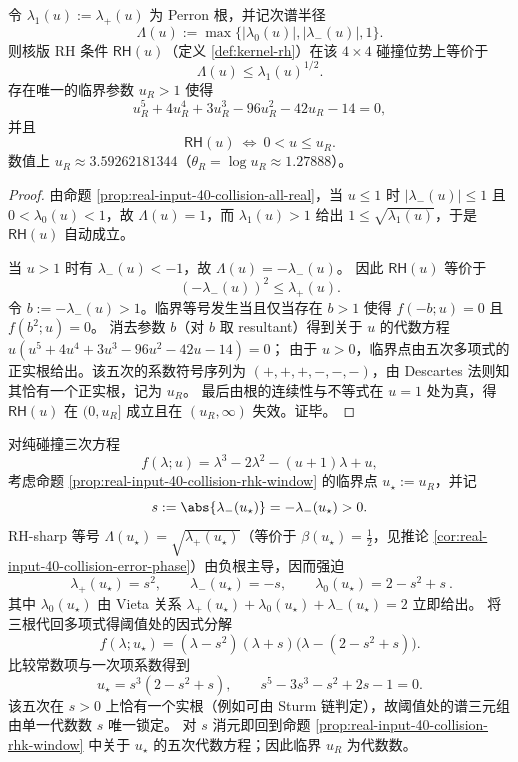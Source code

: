 \begin{proposition}\label{prop:real-input-40-collision-rhk-window}
令 \(\lambda_1(u):=\lambda_+(u)\) 为 Perron 根，并记次谱半径
\[
\Lambda(u):=\max\{|\lambda_0(u)|,|\lambda_-(u)|,1\}.
\]
则核版 RH 条件 \(\textsf{RH}(u)\)（定义 \ref{def:kernel-rh}）在该 \(4\times4\) 碰撞位势上等价于
\[
\Lambda(u)\le \lambda_1(u)^{1/2}.
\]
存在唯一的临界参数 \(u_R>1\) 使得
\[
u_R^5+4u_R^4+3u_R^3-96u_R^2-42u_R-14=0,
\]
并且
\[
\textsf{RH}(u)\ \Longleftrightarrow\ 0<u\le u_R.
\]
数值上 \(u_R\approx 3.59262181344\)（\(\theta_R=\log u_R\approx 1.27888\)）。
\end{proposition}
\begin{proof}
由命题 \ref{prop:real-input-40-collision-all-real}，当 \(u\le 1\) 时 \(|\lambda_-(u)|\le 1\) 且 \(0<\lambda_0(u)<1\)，故 \(\Lambda(u)=1\)，而 \(\lambda_1(u)>1\) 给出 \(1\le \sqrt{\lambda_1(u)}\)，于是 \(\textsf{RH}(u)\) 自动成立。

当 \(u>1\) 时有 \(\lambda_-(u)<-1\)，故 \(\Lambda(u)=-\lambda_-(u)\)。
因此 \(\textsf{RH}(u)\) 等价于
\[
(-\lambda_-(u))^2\le \lambda_+(u).
\]
令 \(b:=-\lambda_-(u)>1\)。临界等号发生当且仅当存在 \(b>1\) 使得
\(
f(-b;u)=0
\)
且
\(
f(b^2;u)=0
\)。
消去参数 \(b\)（对 \(b\) 取 resultant）得到关于 \(u\) 的代数方程
\(
u(u^5+4u^4+3u^3-96u^2-42u-14)=0
\)；
由于 \(u>0\)，临界点由五次多项式的正实根给出。该五次的系数符号序列为 \((+,+,+,-,-,-)\)，由 Descartes 法则知其恰有一个正实根，记为 \(u_R\)。
最后由根的连续性与不等式在 \(u=1\) 处为真，得 \(\textsf{RH}(u)\) 在 \((0,u_R]\) 成立且在 \((u_R,\infty)\) 失效。证毕。
\end{proof}

\begin{remark}\label{rem:collision-cubic-rhsharp-quintic}
对纯碰撞三次方程
\[
f(\lambda;u)=\lambda^3-2\lambda^2-(u+1)\lambda+u,
\]
考虑命题 \ref{prop:real-input-40-collision-rhk-window} 的临界点 \(u_\star:=u_R\)，并记
\[
s:=\abs{\lambda_-(u_\star)}=-\lambda_-(u_\star)>0.
\]
RH-sharp 等号 \(\Lambda(u_\star)=\sqrt{\lambda_+(u_\star)}\)（等价于 \(\beta(u_\star)=\tfrac12\)，见推论 \ref{cor:real-input-40-collision-error-phase}）由负根主导，因而强迫
\[
\boxed{\ \lambda_+(u_\star)=s^2,\qquad \lambda_-(u_\star)=-s,\qquad \lambda_0(u_\star)=2-s^2+s\ }.
\]
其中 \(\lambda_0(u_\star)\) 由 Vieta 关系 \(\lambda_+(u_\star)+\lambda_0(u_\star)+\lambda_-(u_\star)=2\) 立即给出。
将三根代回多项式得阈值处的因式分解
\[
f(\lambda;u_\star)=(\lambda-s^2)(\lambda+s)\bigl(\lambda-(2-s^2+s)\bigr).
\]
比较常数项与一次项系数得到
\[
u_\star=s^3(2-s^2+s),
\qquad
s^5-3s^3-s^2+2s-1=0.
\]
该五次在 \(s>0\) 上恰有一个实根（例如可由 Sturm 链判定），故阈值处的谱三元组由单一代数数 \(s\) 唯一锁定。
对 \(s\) 消元即回到命题 \ref{prop:real-input-40-collision-rhk-window} 中关于 \(u_\star\) 的五次代数方程；因此临界 \(u_R\) 为代数数。
\end{remark}

